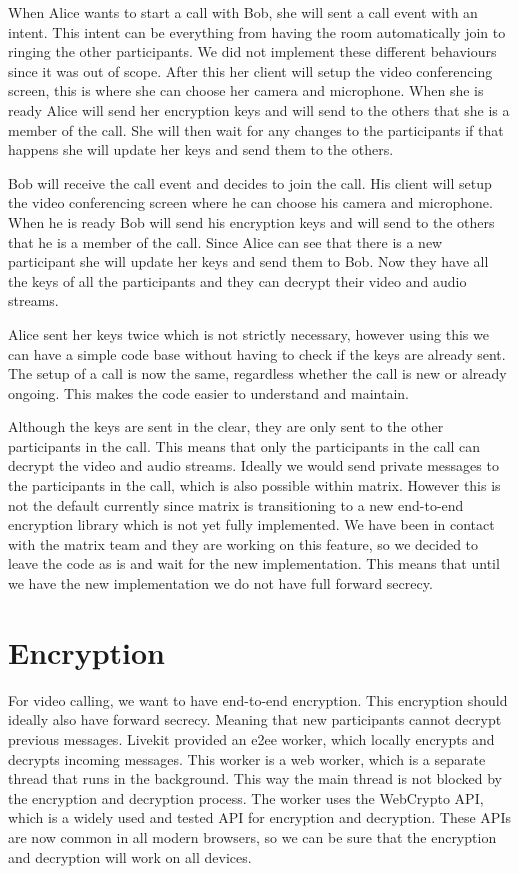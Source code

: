 \documentclass{report}
\begin{document}
When Alice wants to start a call with Bob, she will sent a call event with an intent. This intent can be
everything from having the room automatically join to ringing the other participants. We did not implement
these different behaviours since it was out of scope. After this her client will setup the video conferencing
screen, this is where she can choose her camera and microphone. When she is ready Alice will send her encryption
keys and will send to the others that she is a member of the call. She will then wait for any changes to the
participants
if that happens she will update her keys and send them to the others.

Bob will receive the call event and decides to join the call. His client will setup the video conferencing
screen where he can choose his camera and microphone. When he is ready Bob will send his encryption keys and will
send to the others that he is a member of the call. Since Alice can see that there is a new participant she will
update her keys and send them to Bob. Now they have all the keys of all the participants and they can decrypt their
video and audio streams.

Alice sent her keys twice which is not strictly necessary, however using this we can have a simple code base
without having to check if the keys are already sent. The setup of a call is now the same, regardless whether
the call is new or already ongoing. This makes the code easier to understand and maintain.

Although the keys are sent in the clear, they are only sent to the other participants in the call. This means that
only the participants in the call can decrypt the video and audio streams. Ideally we would send private
messages to the participants in the call, which is also possible within matrix. However this is not the default
currently since matrix is transitioning to a new end-to-end encryption library which is not yet fully implemented.
We have been in contact with the matrix team and they are working on this feature, so we decided to leave the code
as is and wait for the new implementation. This means that until we have the new implementation we do not have
full forward secrecy.


\section{Encryption}

For video calling, we want to have end-to-end encryption. This encryption should ideally also have forward secrecy.
Meaning that new participants cannot decrypt previous messages. Livekit provided an e2ee worker, which locally
encrypts and decrypts incoming messages. This worker is a web worker, which is a separate thread that runs in the
background. This way the main thread is not blocked by the encryption and decryption process. The worker uses the
WebCrypto API, which is a widely used and tested API for encryption and decryption. These APIs are now common in all
modern browsers, so we can be sure that the encryption and decryption will work on all devices.
\end{document}
